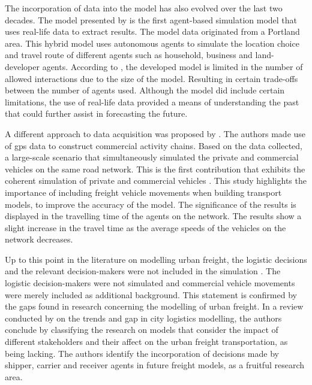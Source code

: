 The incorporation of data into the model has also evolved over the last two decades. The model presented by \citet{donnelly2008hybrid} is the first agent-based simulation model that uses real-life data to extract results. The model data originated from a Portland area. This hybrid model uses autonomous agents to simulate the location choice and travel route of different agents such as household, business and land-developer agents. According to \citet{anand2014ontology}, the developed model is limited in the number of allowed interactions due to the size of the model. Resulting in certain trade-offs between the number of agents used. Although the model did include certain limitations, the use of real-life data provided a means of understanding the past that could further assist in forecasting the future.\par

A different approach to data acquisition was proposed by \citet{joubert2010large}. The authors made use of \acrfull{gps} data to construct commercial activity chains. Based on the data collected, a large-scale scenario that simultaneously simulated the private and commercial vehicles on the same road network. This is the first contribution that exhibits the coherent simulation of private and commercial vehicles \citep{bean2020behavioural}. This study highlights the importance of including freight vehicle movements when building transport models, to improve the accuracy of the model. The significance of the results is displayed in the travelling time of the agents on the network. The results show a slight increase in the travel time as the average speeds of the vehicles on the network decreases.
\par

Up to this point in the literature on modelling urban freight, the logistic decisions and the relevant decision-makers were not included in the simulation \citep{schroeder2012towards}. The logistic decision-makers were not simulated and commercial vehicle movements were merely included as additional background. This statement is confirmed by the gaps found in research concerning the modelling of urban freight. In a review conducted by \citet{anand2012city} on the trends and gap in city logistics modelling, the authors conclude by classifying the research on models that consider the impact of different stakeholders and their affect on the urban freight transportation, as being lacking. The authors identify the incorporation of decisions made by shipper, carrier and receiver agents in future freight models, as a fruitful research area. \par 

